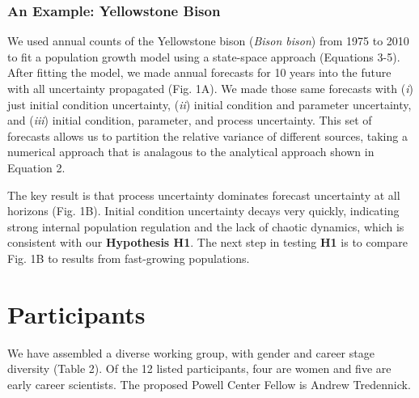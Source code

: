 \documentclass[12pt,]{article}
\begin{document}
\subsubsection{An Example: Yellowstone Bison}

We used annual counts of the Yellowstone bison (\emph{Bison bison}) from 1975 to 2010 to fit a
population growth model using a state-space approach (Equations 3-5).
After fitting the model, we made annual forecasts for 10 years into the
future with all uncertainty propagated (Fig. 1A). We made those same
forecasts with (\emph{i}) just initial condition uncertainty,
(\emph{ii}) initial condition and parameter uncertainty, and
(\emph{iii}) initial condition, parameter, and process uncertainty. This
set of forecasts allows us to partition the relative variance of
different sources, taking a numerical approach that is analagous to the
analytical approach shown in Equation 2.

The key result is that process uncertainty dominates forecast
uncertainty at all horizons (Fig. 1B). Initial condition
uncertainty decays very quickly, indicating strong internal population
regulation and the lack of chaotic dynamics, which is consistent with
our \textbf{Hypothesis H1}. The next step in testing \textbf{H1} is to
compare Fig. 1B to results from fast-growing populations.

\section{Participants}

We have assembled a diverse working group, with gender and career stage
diversity (Table 2). Of the 12 listed participants, four are women and
five are early career scientists. The proposed Powell Center Fellow is
Andrew Tredennick.

\footnotesize
\end{document}
